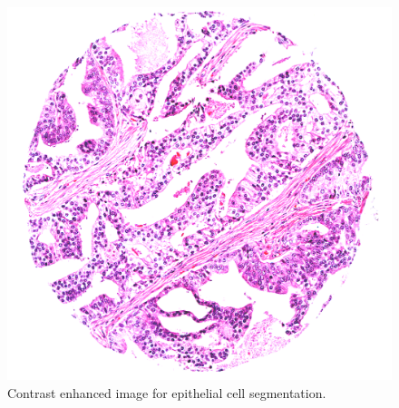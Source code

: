 \begin{figure}[!htb]
\centering
\includegraphics[scale=0.1]{figs/epithelial_contrast.png}
\caption{Contrast enhanced image for epithelial cell segmentation.}
\label{fig:contrast_enhanced}
\centering

\end{figure}


